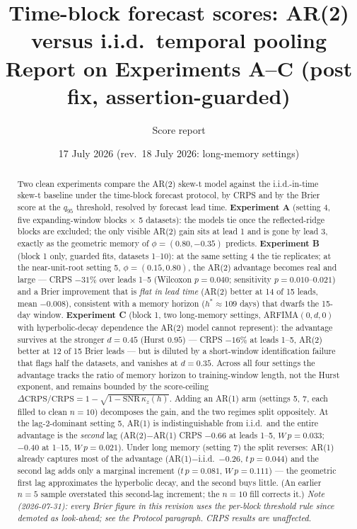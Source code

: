 \documentclass[11pt]{article}
\title{\textbf{Time-block forecast scores: AR(2) versus i.i.d.\ temporal
pooling}\\[2pt]
\large Report on Experiments A--C (post \code{z.init} fix, assertion-guarded)}
\author{Score report}
\date{17 July 2026 \quad(rev.\ 18 July 2026: long-memory settings)}
\begin{document}
\maketitle

\begin{abstract}
Two clean experiments compare the AR(2) skew-t model against the
i.i.d.-in-time skew-t baseline under the time-block forecast protocol, by
CRPS and by the Brier score at the $q_{95}$ threshold, resolved by forecast
lead time. \textbf{Experiment A} (setting 4, five expanding-window blocks
$\times$ 5 datasets): the models tie once the reflected-ridge blocks are
excluded; the only visible AR(2) gain sits at lead 1 and is gone by lead 3,
exactly as the geometric memory of $\phi = (0.80, -0.35)$ predicts.
\textbf{Experiment B} (block 1 only, guarded fits, datasets 1--10): at the
same setting 4 the tie replicates; at the near-unit-root setting 5,
$\phi = (0.15, 0.80)$, the AR(2) advantage becomes real and large --- CRPS
$-31\%$ over leads 1--5 (Wilcoxon $p = 0.040$; sensitivity $p = 0.010$--$0.021$)
and a Brier improvement that is \emph{flat in lead time} (AR(2) better at 14
of 15 leads, mean $-0.008$), consistent with a memory horizon
($h^\ast \approx 109$ days) that dwarfs the 15-day window.
\textbf{Experiment C} (block 1, two long-memory settings, ARFIMA$(0,d,0)$ with
hyperbolic-decay dependence the AR(2) model cannot represent): the advantage
survives at the stronger $d = 0.45$ (Hurst $0.95$) --- CRPS $-16\%$ at leads
1--5, AR(2) better at 12 of 15 Brier leads --- but is diluted by a short-window
identification failure that flags half the datasets, and vanishes at
$d = 0.35$. Across all four settings the advantage tracks the ratio of memory
horizon to training-window length, not the Hurst exponent, and remains
bounded by the score-ceiling
$\Delta\mathrm{CRPS}/\mathrm{CRPS} = 1 - \sqrt{1 - \mathrm{SNR}\,\kappa_z(h)}$.
Adding an AR(1) arm (settings 5, 7, each filled to clean $n = 10$) decomposes
the gain, and the two regimes split oppositely. At the lag-2-dominant
setting 5, AR(1) is indistinguishable from i.i.d.\ and the entire advantage is
the \emph{second} lag (AR(2)$-$AR(1) CRPS $-0.66$ at leads 1--5,
$W\,p = 0.033$; $-0.40$ at 1--15, $W\,p = 0.021$). Under long memory
(setting 7) the split reverses: AR(1) already captures most of the advantage
(AR(1)$-$i.i.d.\ $-0.26$, $t\,p = 0.044$) and the second lag adds only a
marginal increment ($t\,p = 0.081$, $W\,p = 0.111$) --- the geometric first
lag approximates the hyperbolic decay, and the second buys little. (An earlier
$n = 5$ sample overstated this second-lag increment; the $n = 10$ fill
corrects it.)
\emph{Note (2026-07-31): every Brier figure in this revision uses the
per-block threshold rule since demoted as look-ahead; see the Protocol
paragraph. CRPS results are unaffected.}
\end{abstract}
\end{document}
